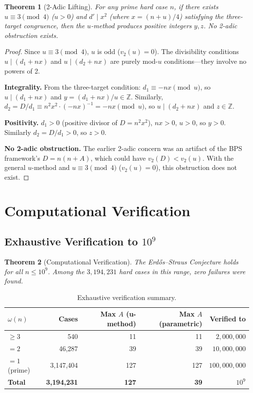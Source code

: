 \documentclass[11pt,a4paper]{article}
\theoremstyle{plain}
\newtheorem{theorem}{Theorem}[section]
\theoremstyle{plain}
\theoremstyle{definition}
\numberwithin{equation}{section}
\begin{document}
\begin{theorem}[2-Adic Lifting]\label{thm:2adic}
For any prime hard case $n$, if there exists $u \equiv 3 \pmod{4}$ ($u > 0$) and $d' \mid x^2$ (where $x = (n+u)/4$) satisfying the three-target congruence, then the $u$-method produces \emph{positive integers} $y, z$. No 2-adic obstruction exists.
\end{theorem}

\begin{proof}
Since $u \equiv 3 \pmod{4}$, $u$ is odd ($v_2(u) = 0$). The divisibility conditions $u \mid (d_1 + nx)$ and $u \mid (d_2 + nx)$ are purely mod-$u$ conditions---they involve no powers of 2.

\textbf{Integrality.} From the three-target condition: $d_1 \equiv -nx \pmod{u}$, so $u \mid (d_1 + nx)$ and $y = (d_1 + nx)/u \in \mathbb{Z}$. Similarly, $d_2 = D/d_1 \equiv n^2 x^2 \cdot (-nx)^{-1} = -nx \pmod{u}$, so $u \mid (d_2 + nx)$ and $z \in \mathbb{Z}$.

\textbf{Positivity.} $d_1 > 0$ (positive divisor of $D = n^2 x^2$), $nx > 0$, $u > 0$, so $y > 0$. Similarly $d_2 = D/d_1 > 0$, so $z > 0$.

\textbf{No 2-adic obstruction.} The earlier 2-adic concern was an artifact of the BPS framework's $D = n(n+A)$, which could have $v_2(D) < v_2(u)$. With the general $u$-method and $u \equiv 3 \pmod{4}$ ($v_2(u) = 0$), this obstruction does not exist.
\end{proof}

\section{Computational Verification}

\subsection{Exhaustive Verification to \texorpdfstring{$10^9$}{10^9}}

\begin{theorem}[Computational Verification]\label{thm:comp}
The Erd\H{o}s--Straus Conjecture holds for all $n \leq 10^9$. Among the $3{,}194{,}231$ hard cases in this range, zero failures were found.
\end{theorem}

\begin{table}[h]
\centering
\begin{tabular}{lrrrr}
\toprule
$\omega(n)$ & Cases & Max $A$ (u-method) & Max $A$ (parametric) & Verified to \\
\midrule
$\geq 3$ & 540 & 11 & 11 & $2{,}000{,}000$ \\
$= 2$ & 46,287 & 39 & 39 & $10{,}000{,}000$ \\
$= 1$ (prime) & 3,147,404 & 127 & 127 & $100{,}000{,}000$ \\
\midrule
\textbf{Total} & \textbf{3,194,231} & \textbf{127} & \textbf{39} & $10^9$ \\
\bottomrule
\end{tabular}
\caption{Exhaustive verification summary.}
\end{table}
\end{document}

